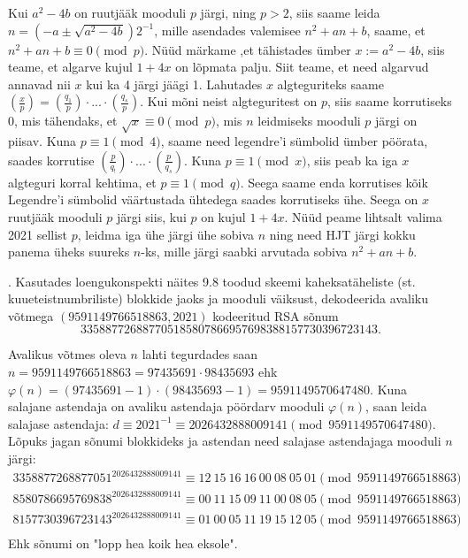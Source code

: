 \documentclass[a4paper, 10pt]{article}
\begin{document}
\bigskip
 Kui $ a^2-4b$ on ruutjääk mooduli $p$ järgi, ning $p>2$, siis saame leida $n=(-a\pm\sqrt{a^2-4b} )2^{-1}$, mille asendades valemisee $n^2+an+b$, saame, et $n^2+an+b\equiv0\pmod{p}$. Nüüd märkame ,et tähistades ümber $x:=a^2-4b$, siis teame, et algarve kujul $1+4x$ on lõpmata palju. Siit teame, et need algarvud annavad nii $x$ kui ka 4 järgi jäägi 1. Lahutades $x$ algteguriteks saame $(\frac{x}{p})=(\frac{q_1}{p})\cdot...\cdot(\frac{q_s}{p})$. Kui mõni neist algteguritest on $p$, siis saame korrutiseks 0, mis tähendaks, et $\sqrt{x}\equiv0\pmod{p}$, mis $n$ leidmiseks mooduli $p$ järgi on piisav. Kuna $p\equiv1\pmod{4}$, saame need legendre'i sümbolid ümber pöörata, saades korrutise $(\frac{p}{q_!})\cdot...\cdot(\frac{p}{q_s})$. Kuna $p\equiv 1\pmod{x}$, siis peab ka iga $x$ algteguri korral kehtima, et  $p\equiv 1\pmod{q}$. Seega saame enda korrutises kõik Legendre'i sümbolid väärtustada ühtedega saades korrutiseks ühe. Seega on $x$ ruutjääk mooduli $p$ järgi siis, kui $p$ on kujul $1+4x$. Nüüd peame lihtsalt valima 2021 sellist $p$, leidma iga ühe järgi  ühe sobiva $n$ ning need HJT järgi kokku panema üheks suureks $n$-ks, mille järgi saabki arvutada sobiva $n^2+an+b$.

\bigskip
\pagebreak


. Kasutades loengukonspekti näites 9.8 toodud skeemi kaheksatäheliste (st. kuueteist\-numbriliste) blokkide jaoks ja mooduli väiksust, dekodeerida avaliku võtmega $(9591149766518863,2021)$ kodeeritud RSA sõnum $$3358877268877051 8580786695769838 8157730396723143.$$ 

\bigskip
Avalikus võtmes oleva $n$ lahti tegurdades saan $n=9591149766518863=97435691\cdot98435693$ ehk $\varphi(n)=(97435691-1)\cdot(98435693-1)=9591149570647480$. Kuna salajane astendaja on avaliku astendaja pöördarv mooduli $\varphi(n)$, saan leida salajase astendaja: $d\equiv2021^{-1}\equiv2026432888009141\pmod{9591149570647480}$. Lõpuks jagan sõnumi blokkideks ja astendan need salajase astendajaga mooduli $n$ järgi:
\begin{gather*}
3358877268877051^{2026432888009141}\equiv12\ 15\ 16\ 16\ 00\ 08\ 05\ 01\pmod{9591149766518863}\\
8580786695769838^{2026432888009141}\equiv00\ 11\ 15\ 09\ 11\ 00\ 08\ 05\pmod{9591149766518863}\\
8157730396723143^{2026432888009141}\equiv01\ 00\ 05\ 11\ 19\ 15\ 12\ 05\pmod{9591149766518863}\\
\end{gather*}
Ehk sõnumi on "lopp hea koik hea eksole".
\bigskip
\end{document}

